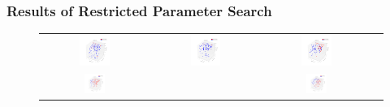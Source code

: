 \documentclass{beamer}
\begin{document}
\frame
{
  \frametitle{Results of Restricted Parameter Search}
  \begin{figure}[H]
  \centering
        \begin{tabular}{@{}cc@{}cc@{}}
                \includegraphics[width = 0.3\textwidth]{./pics/Restricted_Parameter_space_d2500_w250.png} &
                \includegraphics[width = 0.3\textwidth]{./pics/Restricted_Parameter_space_d3000_w500.png} &
                \includegraphics[width = 0.3\textwidth]{./pics/Restricted_Parameter_space_d2000_w2000.png} \\
                \includegraphics[width = 0.2\textwidth]{./pics/Restricted_Parameter_space_d500_w3000.png} &&
		\includegraphics[width = 0.2\textwidth]{./pics/Restricted_Parameter_space_d250_w2500.png} \\
        \end{tabular}
        \label{RestrictParam}
  \end{figure}

}
\end{document}
